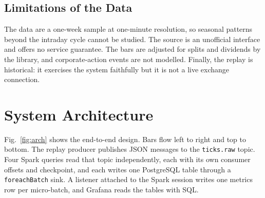 \documentclass[conference]{IEEEtran}
\newcommand{\code}[1]{\texttt{#1}}
\begin{document}
\subsection{Limitations of the Data}
The data are a one-week sample at one-minute resolution, so seasonal patterns beyond the intraday cycle cannot be studied. The source is an unofficial interface and offers no service guarantee. The bars are adjusted for splits and dividends by the library, and corporate-action events are not modelled. Finally, the replay is historical: it exercises the system faithfully but it is not a live exchange connection.

\section{System Architecture}
Fig.~\ref{fig:arch} shows the end-to-end design. Bars flow left to right and top to bottom. The replay producer publishes JSON messages to the \code{ticks.raw} topic. Four Spark queries read that topic independently, each with its own consumer offsets and checkpoint, and each writes one PostgreSQL table through a \code{foreachBatch} sink. A listener attached to the Spark session writes one metrics row per micro-batch, and Grafana reads the tables with SQL.
\end{document}

